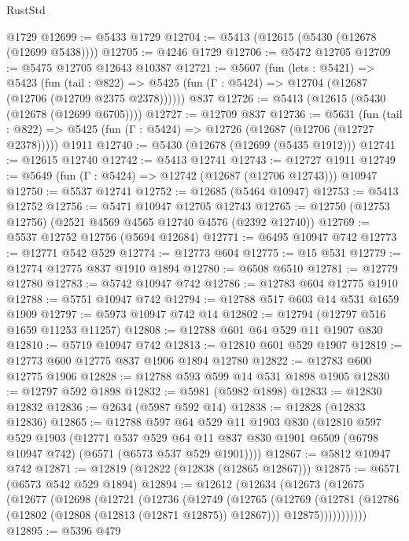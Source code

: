 \begin{lexlean}{RustStd}
\begin{coremodule}
    @1729
@12699 := @5433 @1729
@12704 := @5413 (@12615 (@5430 (@12678 (@12699 @5438))))
@12705 := @4246 @1729
@12706 := @5472 @12705
@12709 := @5475 @12705 @12643 @10387
@12721 := @5607
    (fun (lets : @5421) =>
    @5423
      (fun (tail : @822) =>
      @5425 (fun (Γ : @5424) => @12704 (@12687 (@12706 (@12709 @2375 @2378))))))
    @837
@12726 := @5413 (@12615 (@5430 (@12678 (@12699 @6705))))
@12727 := @12709 @837
@12736 := @5631
    (fun (tail : @822) => @5425 (fun (Γ : @5424) => @12726 (@12687 (@12706 (@12727 @2378)))))
    @1911
@12740 := @5430 (@12678 (@12699 (@5435 @1912)))
@12741 := @12615 @12740
@12742 := @5413 @12741
@12743 := @12727 @1911
@12749 := @5649 (fun (Γ : @5424) => @12742 (@12687 (@12706 @12743))) @10947
@12750 := @5537 @12741
@12752 := @12685 (@5464 @10947)
@12753 := @5413 @12752
@12756 := @5471 @10947 @12705 @12743
@12765 := @12750 (@12753 @12756) (@2521 @4569 @4565 @12740 @4576 (@2392 @12740))
@12769 := @5537 @12752 @12756 (@5694 @12684)
@12771 := @6495 @10947 @742
@12773 := @12771 @542 @529
@12774 := @12773 @604
@12775 := @15 @531
@12779 := @12774 @12775 @837 @1910 @1894
@12780 := @6508 @6510
@12781 := @12779 @12780
@12783 := @5742 @10947 @742
@12786 := @12783 @604 @12775 @1910
@12788 := @5751 @10947 @742
@12794 := @12788 @517 @603 @14 @531 @1659 @1909
@12797 := @5973 @10947 @742 @14
@12802 := @12794 (@12797 @516 @1659 @11253 @11257)
@12808 := @12788 @601 @64 @529 @11 @1907 @830
@12810 := @5719 @10947 @742
@12813 := @12810 @601 @529 @1907
@12819 := @12773 @600 @12775 @837 @1906 @1894 @12780
@12822 := @12783 @600 @12775 @1906
@12828 := @12788 @593 @599 @14 @531 @1898 @1905
@12830 := @12797 @592 @1898
@12832 := @5981 (@5982 @1898)
@12833 := @12830 @12832
@12836 := @2634 (@5987 @592 @14)
@12838 := @12828 (@12833 @12836)
@12865 := @12788
    @597
    @64
    @529
    @11
    @1903
    @830
    (@12810
      @597
      @529
      @1903
      (@12771
        @537
        @529
        @64
        @11
        @837
        @830
        @1901
        @6509
        (@6798 @10947 @742)
        (@6571 (@6573 @537 @529 @1901))))
@12867 := @5812 @10947 @742
@12871 := @12819 (@12822 (@12838 (@12865 @12867)))
@12875 := @6571 (@6573 @542 @529 @1894)
@12894 := @12612
    (@12634
      (@12673
        (@12675
          (@12677
            (@12698
              (@12721
                (@12736
                  (@12749
                    (@12765
                      (@12769
                        (@12781
                          (@12786 (@12802 (@12808 (@12813 (@12871 @12875)) @12867)))
                          @12875)))))))))))
@12895 := @5396 @479

\end{coremodule}
\end{lexlean}
